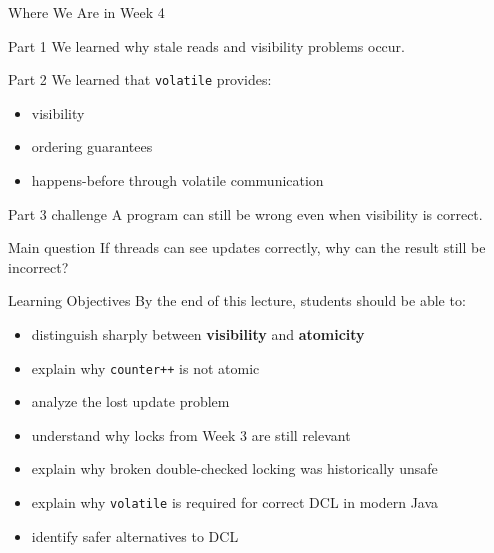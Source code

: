 \documentclass[aspectratio=169,11pt]{beamer}
\begin{document}
	\begin{frame}{Where We Are in Week 4}
		\begin{block}{Part 1}
			We learned why stale reads and visibility problems occur.
		\end{block}
		
		\vspace{0.2cm}
		
		\begin{block}{Part 2}
			We learned that \texttt{volatile} provides:
			\begin{itemize}
				\item visibility
				\item ordering guarantees
				\item happens-before through volatile communication
			\end{itemize}
		\end{block}
		
		\vspace{0.2cm}
		
		\begin{alertblock}{Part 3 challenge}
			A program can still be wrong even when visibility is correct.
		\end{alertblock}
		
		\vspace{0.2cm}
		
		\begin{exampleblock}{Main question}
			If threads can see updates correctly, why can the result still be incorrect?
		\end{exampleblock}
	\end{frame}
	
	\begin{frame}{Learning Objectives}
		By the end of this lecture, students should be able to:
		
		\begin{itemize}
			\item distinguish sharply between \textbf{visibility} and \textbf{atomicity}
			\item explain why \texttt{counter++} is not atomic
			\item analyze the lost update problem
			\item understand why locks from Week 3 are still relevant
			\item explain why broken double-checked locking was historically unsafe
			\item explain why \texttt{volatile} is required for correct DCL in modern Java
			\item identify safer alternatives to DCL
		\end{itemize}
	\end{frame}
	
\end{document}
